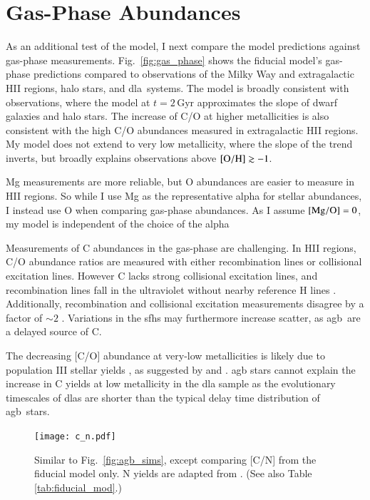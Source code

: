 \documentclass[12pt,oneside,letterpaper]{report}
\newcommand{\agb}{\gls{agb}}
\newcommand{\sfh}{\gls{sfh}}
\newcommand{\dla}{\gls{dla}}
\newcommand{\about}[1]{${\sim} #1$}
\begin{document}
\section{Gas-Phase Abundances}\label{sec:gas}

As an additional test of the model, I next compare the model predictions against gas-phase measurements. Fig.~\ref{fig:gas_phase} shows the fiducial model's gas-phase predictions compared to observations of the Milky Way and extragalactic HII regions, halo stars, and \dla\ systems. The model is broadly consistent with observations, where the model at $t=2$\,Gyr approximates the slope of dwarf galaxies and halo stars. The increase of C/O at higher metallicities is also consistent with the high C/O abundances measured in extragalactic HII regions. 
My model does not extend to very low metallicity, where the slope of the trend inverts, but broadly explains observations above $\rm [O/H] \gtrsim -1$. 

Mg measurements are more reliable, but O abundances are easier to measure in HII regions. So while I use Mg as the representative \gls{alpha} for stellar abundances, I instead use O when comparing gas-phase abundances. As I assume ${\rm[Mg/O]}=0$, my model is independent of the choice of the \gls{alpha}

Measurements of C abundances in the gas-phase are challenging. In HII regions, C/O abundance ratios are measured with either recombination lines or collisional excitation lines. However C lacks strong collisional excitation lines, and recombination lines fall in the ultraviolet without nearby reference H lines \citep{skillman+20}. Additionally, recombination and collisional excitation measurements disagree by a factor of \about{2} \citep{GR07}.
Variations in the \sfh{}s may furthermore increase scatter, as \agb\ are a delayed source of C.

The decreasing [C/O] abundance at very-low metallicities is likely due to population III stellar yields \citep[e.g.][]{hirschi07}, as suggested by \citet{cooke+17} and \citet{FN15}. \Gls{agb} stars cannot explain the increase in C yields at low metallicity in the \dla{} sample as the evolutionary timescales of \dla{}s are shorter than the typical delay time distribution of \agb\ stars.

\begin{figure}[htp]
    \centering
    \texttt{[image: c\_n.pdf]}
    \caption[C/N Abundance Agreement]{Similar to Fig.~\ref{fig:agb_sims}, except comparing [C/N] from the fiducial model only. N yields are adapted from \cite{james+23}. (See also Table \ref{tab:fiducial_mod}.)
    }
\end{figure}
\end{document}
